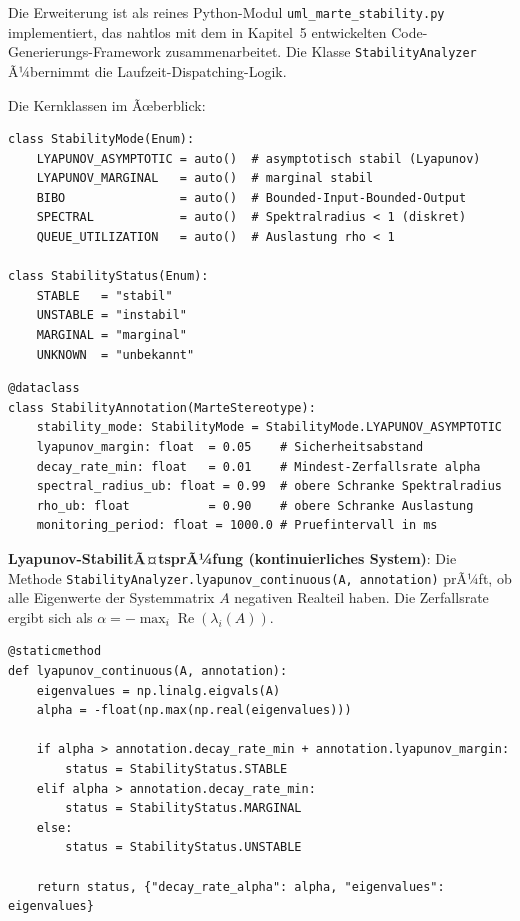﻿\documentclass[a4paper,12pt]{report}
\theoremstyle{definition}
\begin{document}
Die Erweiterung ist als reines Python-Modul
\texttt{uml\_marte\_stability.py} implementiert, das nahtlos mit dem in
Kapitel~5 entwickelten Code-Generierungs-Framework zusammenarbeitet. Die
Klasse \texttt{StabilityAnalyzer} Ã¼bernimmt die Laufzeit-Dispatching-Logik.

Die Kernklassen im Ãœberblick:
\begin{lstlisting}[style=python,
	caption={Enum-Typen fÃ¼r StabilitÃ¤tsmodi und -status},
	label={lst:stability-enums}]
class StabilityMode(Enum):
	LYAPUNOV_ASYMPTOTIC = auto()  # asymptotisch stabil (Lyapunov)
	LYAPUNOV_MARGINAL   = auto()  # marginal stabil
	BIBO                = auto()  # Bounded-Input-Bounded-Output
	SPECTRAL            = auto()  # Spektralradius < 1 (diskret)
	QUEUE_UTILIZATION   = auto()  # Auslastung rho < 1
	
class StabilityStatus(Enum):
	STABLE   = "stabil"
	UNSTABLE = "instabil"
	MARGINAL = "marginal"
	UNKNOWN  = "unbekannt"
\end{lstlisting}

\begin{lstlisting}[style=python,
	caption={Stereotyp \texttt{<<StabilityAnnotation>>} als Python-Dataclass},
	label={lst:stability-annotation-class}]
@dataclass
class StabilityAnnotation(MarteStereotype):
	stability_mode: StabilityMode = StabilityMode.LYAPUNOV_ASYMPTOTIC
	lyapunov_margin: float  = 0.05    # Sicherheitsabstand
	decay_rate_min: float   = 0.01    # Mindest-Zerfallsrate alpha
	spectral_radius_ub: float = 0.99  # obere Schranke Spektralradius
	rho_ub: float           = 0.90    # obere Schranke Auslastung
	monitoring_period: float = 1000.0 # Pruefintervall in ms
\end{lstlisting}

\textbf{Lyapunov-StabilitÃ¤tsprÃ¼fung (kontinuierliches System)}:
Die Methode \texttt{Stabili\newline tyAnalyzer.lyapunov\_continuous(A, annotation)}
prÃ¼ft, ob alle Eigenwerte der Systemmatrix $A$ negativen Realteil haben.
Die Zerfallsrate ergibt sich als
$\alpha = -\max_i \operatorname{Re}(\lambda_i(A))$.

\begin{lstlisting}[style=python,
	caption={Lyapunov-StabilitÃ¤tsprÃ¼fung via Eigenwertanalyse},
	label={lst:lyapunov}]
@staticmethod
def lyapunov_continuous(A, annotation):
	eigenvalues = np.linalg.eigvals(A)
	alpha = -float(np.max(np.real(eigenvalues)))
	
	if alpha > annotation.decay_rate_min + annotation.lyapunov_margin:
		status = StabilityStatus.STABLE
	elif alpha > annotation.decay_rate_min:
		status = StabilityStatus.MARGINAL
	else:
		status = StabilityStatus.UNSTABLE
	
	return status, {"decay_rate_alpha": alpha, "eigenvalues": eigenvalues}
\end{lstlisting}
\end{document}

